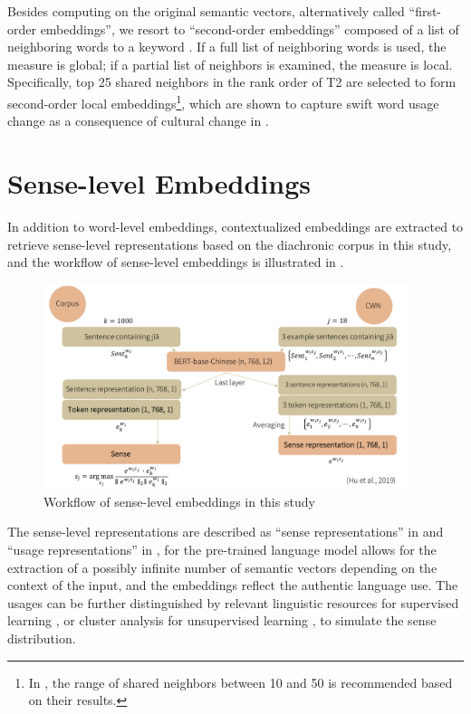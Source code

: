 Besides computing on the original semantic vectors, alternatively called ``first-order embeddings'', we resort to ``second-order embeddings'' composed of a list of neighboring words to a keyword \textcite{hamilton2016cultural}. If a full list of neighboring words is used, the measure is global; if a partial list of neighbors is examined, the measure is local. Specifically, top 25 shared neighbors in the rank order of T2 are selected to form second-order local embeddings\footnote{In \textcite{hamilton2016cultural}, the range of shared neighbors between 10 and 50 is recommended based on their results.}, which are shown to capture swift word usage change as a consequence of cultural change in \textcite{hamilton2016cultural}.

\section{Sense-level Embeddings}
In addition to word-level embeddings, contextualized embeddings are extracted to retrieve sense-level representations based on the diachronic corpus in this study, and the workflow of sense-level embeddings is illustrated in .

\begin{figure}[H]
  \centering
  \includegraphics[height=0.4\textheight,width=0.95\textwidth,keepaspectratio]{figures_new/from_slides/workflow_sense_level.pdf}
  \caption{Workflow of sense-level embeddings in this study}
  \label{fig:workflow_sense_level}
\end{figure}

The sense-level representations are described as ``sense representations'' in \textcite{hu2019diachronic} and ``usage representations'' in \textcite{giulianelli2019lexical}, for the pre-trained language model allows for the extraction of a possibly infinite number of semantic vectors depending on the context of the input, and the embeddings reflect the authentic language use. The usages can be further distinguished by relevant linguistic resources for supervised learning \parencite{hu2019diachronic}, or cluster analysis for unsupervised learning \parencite{giulianelli2019lexical}, to simulate the sense distribution.

